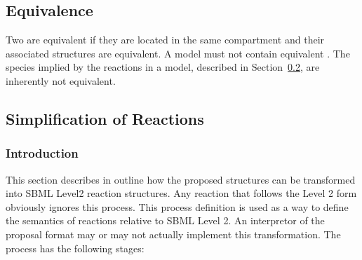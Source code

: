 \documentclass{cekarticle}
\begin{document}
\subsection{ Equivalence}
\label{sec:species-equals}

Two  are equivalent if they are located in the same
compartment and their associated  structures
are equivalent.  A model must not contain equivalent
. The species implied by the reactions in a model,
described in Section~\ref{sec:reaction-simplification}, are
inherently not equivalent.

\subsection{Simplification of Reactions}
\label{sec:reaction-simplification}

\subsubsection{Introduction}
\label{sec:reaction-simplification-intro}

This section describes in outline how the proposed
 structures can be transformed into SBML Level2
reaction structures.  Any reaction that follows the Level 2 form
obviously ignores this process.  This process definition is used
as a way to define the semantics of reactions relative to SBML
Level 2.  An interpretor of the proposal format may or may not
actually implement this transformation.  The process has the
following stages:
\end{document}

